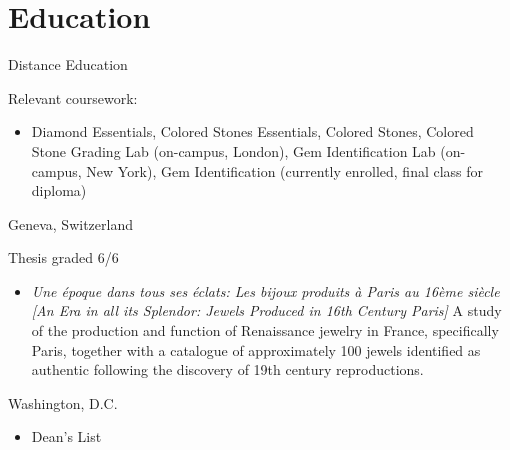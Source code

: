 \section{Education}
 {Distance Education}{}{
  Relevant coursework:
  \begin{itemize}
  \item Diamond Essentials, Colored Stones Essentials, Colored Stones, Colored Stone Grading Lab (on-campus, London), Gem Identification Lab (on-campus, New York), Gem Identification (currently enrolled, final class for diploma)
  \end{itemize}
}
\vspace{1mm}%
 {Geneva, Switzerland}{}{
  Thesis graded 6/6
   \begin{itemize}
   \item \textit {Une \'{e}poque dans tous ses \'{e}clats: Les bijoux produits \`{a} Paris au 16\`{e}me 
     si\`{e}cle} \newline{}%
     \textit {[An Era in all its Splendor: Jewels Produced in 16th Century Paris]} \newline{}%
     A study of the production and function of Renaissance jewelry in France, specifically Paris, together with 
     a catalogue of approximately 100 jewels identified as authentic following the discovery of 19th century reproductions. 
   \end{itemize}
}
\vspace{1mm}%
 {Washington, D.C.}{}{
   \begin{itemize}
   \item Dean's List  
   \end{itemize}
}


